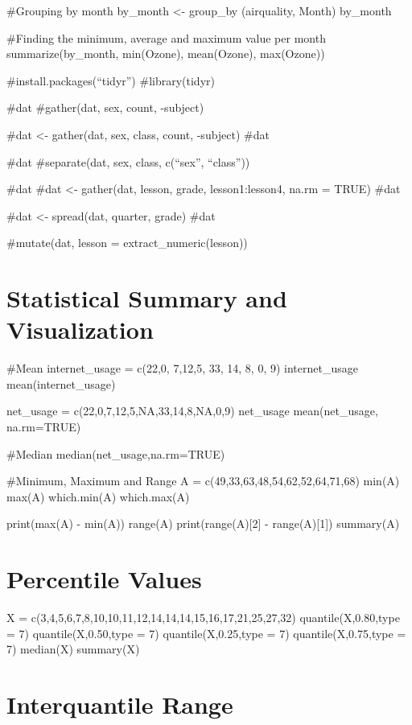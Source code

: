 \documentclass[
]{article}
\begin{document}
\#Grouping by month by\_month \textless- group\_by (airquality, Month)
by\_month

\#Finding the minimum, average and maximum value per month
summarize(by\_month, min(Ozone), mean(Ozone), max(Ozone))

\#install.packages(``tidyr'') \#library(tidyr)

\#dat \#gather(dat, sex, count, -subject)

\#dat \textless- gather(dat, sex, class, count, -subject) \#dat

\#dat \#separate(dat, sex, class, c(``sex'', ``class''))

\#dat \#dat \textless- gather(dat, lesson, grade, lesson1:lesson4, na.rm
= TRUE) \#dat

\#dat \textless- spread(dat, quarter, grade) \#dat

\#mutate(dat, lesson = extract\_numeric(lesson))

\section{Statistical Summary and
Visualization}\label{statistical-summary-and-visualization}

\#Mean internet\_usage = c(22,0, 7,12,5, 33, 14, 8, 0, 9)
internet\_usage mean(internet\_usage)

net\_usage = c(22,0,7,12,5,NA,33,14,8,NA,0,9) net\_usage
mean(net\_usage, na.rm=TRUE)

\#Median median(net\_usage,na.rm=TRUE)

\#Minimum, Maximum and Range A = c(49,33,63,48,54,62,52,64,71,68) min(A)
max(A) which.min(A) which.max(A)

print(max(A) - min(A)) range(A) print(range(A){[}2{]} - range(A){[}1{]})
summary(A)

\section{Percentile Values}\label{percentile-values}

X = c(3,4,5,6,7,8,10,10,11,12,14,14,14,15,16,17,21,25,27,32)
quantile(X,0.80,type = 7) quantile(X,0.50,type = 7) quantile(X,0.25,type
= 7) quantile(X,0.75,type = 7) median(X) summary(X)

\section{Interquantile Range}\label{interquantile-range}
\end{document}
